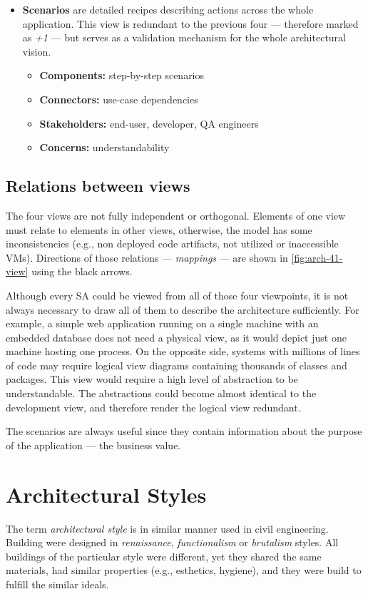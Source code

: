 \documentclass[thesis=M,english,hidelinks]{FITthesis}[2012/10/20]
\begin{document}
\begin{itemize}
    \item \textbf{Scenarios} are detailed recipes describing actions across the whole application. This view is redundant to the previous four --- therefore marked as \textit{+1} --- but serves as a validation mechanism for the whole architectural vision.
    \begin{itemize}
        \item \textbf{Components:} step-by-step scenarios
        \item \textbf{Connectors:} use-case dependencies
        \item \textbf{Stakeholders:} end-user, developer, QA engineers
        \item \textbf{Concerns:} understandability
    \end{itemize}
\end{itemize}

\subsection{Relations between views}
The four views are not fully independent or orthogonal. Elements of one view must relate to elements in other views, otherwise, the model has some inconsistencies (e.g., non deployed code artifacts, not utilized or inaccessible \acrshort{VM}s). Directions of those relations --- \textit{mappings} --- are shown in \ref{fig:arch-41-view} using the black arrows.

Although every \acrlong{SA} could be viewed from all of those four viewpoints, it is not always necessary to draw all of them to describe the architecture sufficiently. For example, a simple web application running on a single machine with an embedded database does not need a physical view, as it would depict just one machine hosting one process. On the opposite side, systems with millions of lines of code may require logical view diagrams containing thousands of classes and packages. This view would require a high level of abstraction to be understandable. The abstractions could become almost identical to the development view, and therefore render the logical view redundant.

The scenarios are always useful since they contain information about the purpose of the application --- the business value.

\section{Architectural Styles}
The term \textit{architectural style} is in similar manner used in civil engineering. Building were designed in \textit{renaissance}, \textit{functionalism} or \textit{brutalism} styles. All buildings of the particular style were different, yet they shared the same materials, had similar properties (e.g., esthetics, hygiene), and they were build to fulfill the similar ideals.
\end{document}
